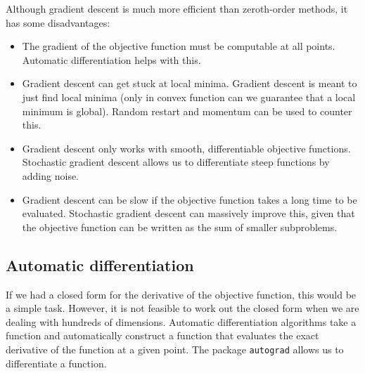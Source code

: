 \documentclass[a4paper, openany]{memoir}
\begin{document}
Although gradient descent is much more efficient than zeroth-order methods, it has some disadvantages:
\begin{itemize}
    \item The gradient of the objective function must be computable at all points. Automatic differentiation helps with this.
    \item Gradient descent can get stuck at local minima. Gradient descent is meant to just find local minima (only in convex function can we guarantee that a local minimum is global). Random restart and momentum can be used to counter this.
    \item Gradient descent only works with smooth, differentiable objective functions. Stochastic gradient descent allows us to differentiate steep functions by adding noise.
    \item Gradient descent can be slow if the objective function takes a long time to be evaluated. Stochastic gradient descent can massively improve this, given that the objective function can be written as the sum of smaller subproblems.
\end{itemize}

\subsection{Automatic differentiation}
If we had a closed form for the derivative of the objective function, this would be a simple task. However, it is not feasible to work out the closed form when we are dealing with hundreds of dimensions. Automatic differentiation algorithms take a function and automatically construct a function that evaluates the exact derivative of the function at a given point. The package \texttt{autograd} allows us to differentiate a function.
\end{document}
